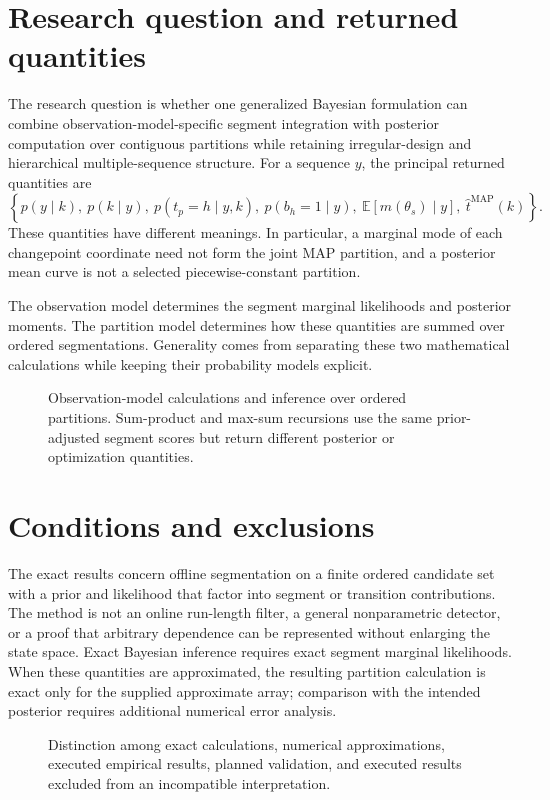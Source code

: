 \section{Research question and returned quantities}
The research question is whether one generalized Bayesian formulation can combine
observation-model-specific segment integration with posterior computation over contiguous
partitions while retaining irregular-design and hierarchical multiple-sequence structure. For a
sequence $y$, the principal returned quantities are
\[
\left\{p(y\mid k),\ p(k\mid y),\ p(t_p=h\mid y,k),\
p(b_h=1\mid y),\ \mathbb E[m(\theta_s)\mid y],\
\widehat t^{\mathrm{MAP}}(k)\right\}.
\]
These quantities have different meanings. In particular, a marginal mode of each changepoint
coordinate need not form the joint MAP partition, and a posterior mean curve is not a selected
piecewise-constant partition.

\begin{keyidea}
The observation model determines the segment marginal likelihoods and posterior moments. The
partition model determines how these quantities are summed over ordered segmentations. Generality
comes from separating these two mathematical calculations while keeping their probability models
explicit.
\end{keyidea}

\begin{figure}[H]
\centering
\resizebox{0.96\textwidth}{!}{}
\caption{Observation-model calculations and inference over ordered partitions. Sum-product and
max-sum recursions use the same prior-adjusted segment scores but return different posterior or
optimization quantities.}
\label{fig:block-to-global}
\end{figure}

\section{Conditions and exclusions}
The exact results concern offline segmentation on a finite ordered candidate set with a prior and
likelihood that factor into segment or transition contributions. The method is not an online
run-length filter, a general nonparametric detector, or a proof that arbitrary dependence can be
represented without enlarging the state space. Exact Bayesian inference requires exact segment
marginal likelihoods. When these quantities are approximated, the resulting partition calculation
is exact only for the supplied approximate array; comparison with the intended posterior requires
additional numerical error analysis.

\begin{figure}[H]
\centering
\resizebox{0.96\textwidth}{!}{}
\caption{Distinction among exact calculations, numerical approximations, executed empirical
results, planned validation, and executed results excluded from an incompatible interpretation.}
\label{fig:evidence-status}
\end{figure}
